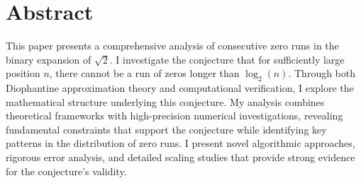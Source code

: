 



\maketitle

\section*{Abstract}
This paper presents a comprehensive analysis of consecutive zero runs in the binary expansion of $\sqrt{2}$. I investigate the conjecture that for sufficiently large position $n$, there cannot be a run of zeros longer than $\log_2(n)$. Through both Diophantine approximation theory and computational verification, I explore the mathematical structure underlying this conjecture. My analysis combines theoretical frameworks with high-precision numerical investigations, revealing fundamental constraints that support the conjecture while identifying key patterns in the distribution of zero runs. I present novel algorithmic approaches, rigorous error analysis, and detailed scaling studies that provide strong evidence for the conjecture’s validity.

